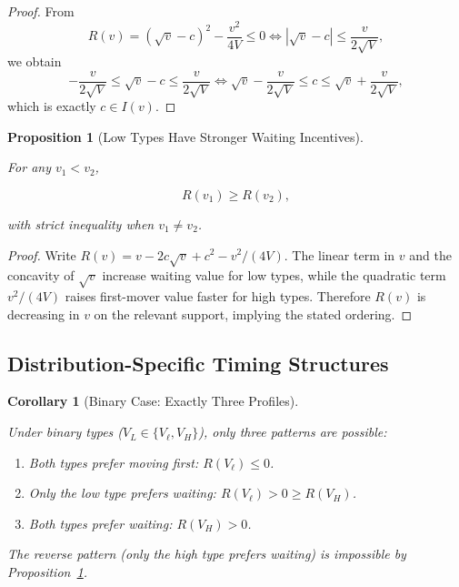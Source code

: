 \documentclass[
  english,
  a4paper,
  12pt]{article}
\providecommand{\tightlist}{%
  \setlength{\itemsep}{0pt}\setlength{\parskip}{0pt}}
\theoremstyle{plain}
\newtheorem{proposition}{Proposition}[section]
\theoremstyle{plain}
\newtheorem{corollary}{Corollary}[section]
\theoremstyle{definition}
\theoremstyle{remark}
\begin{document}
\begin{proof}
From \[
R(v)=\left(\sqrt v-c\right)^2-\frac{v^2}{4V}\le 0
\iff
\left|\sqrt v-c\right|\le \frac{v}{2\sqrt V},
\] we obtain \[
-\frac{v}{2\sqrt V}\le \sqrt v-c\le \frac{v}{2\sqrt V}
\iff
\sqrt v-\frac{v}{2\sqrt V}\le c\le \sqrt v+\frac{v}{2\sqrt V},
\] which is exactly \(c\in I(v)\).
\end{proof}

\begin{proposition}[Low Types Have Stronger Waiting
Incentives]\protect\hypertarget{prp-low-more-wait}{}\label{prp-low-more-wait}

For any \(v_1<v_2\),

\[
R(v_1)\ge R(v_2),
\]

with strict inequality when \(v_1\neq v_2\).

\end{proposition}

\begin{proof}
Write \(R(v)=v-2c\sqrt v+c^2-v^2/(4V)\). The linear term in \(v\) and
the concavity of \(\sqrt v\) increase waiting value for low types, while
the quadratic term \(v^2/(4V)\) raises first-mover value faster for high
types. Therefore \(R(v)\) is decreasing in \(v\) on the relevant
support, implying the stated ordering.
\end{proof}

\subsection{Distribution-Specific Timing
Structures}\label{distribution-specific-timing-structures}

\begin{corollary}[Binary Case: Exactly Three
Profiles]\protect\hypertarget{cor-three-profiles}{}\label{cor-three-profiles}

Under binary types (\(V_L\in\{V_\ell,V_H\}\)), only three patterns are
possible:

\begin{enumerate}
\def\labelenumi{\arabic{enumi}.}
\tightlist
\item
  Both types prefer moving first: \(R(V_\ell)\le 0\).
\item
  Only the low type prefers waiting: \(R(V_\ell)>0\ge R(V_H)\).
\item
  Both types prefer waiting: \(R(V_H)>0\).
\end{enumerate}

The reverse pattern (only the high type prefers waiting) is impossible
by Proposition~\ref{prp-low-more-wait}.

\end{corollary}
\end{document}
